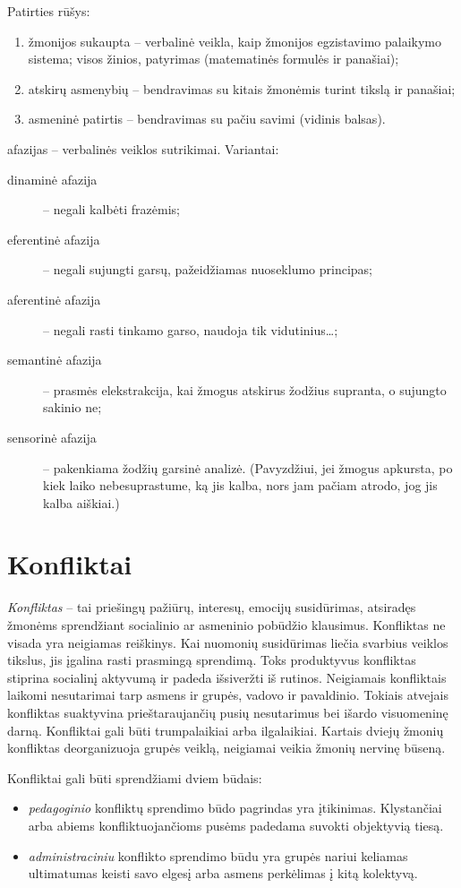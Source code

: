 Patirties rūšys:
\begin{enumerate}
  \item žmonijos sukaupta – verbalinė veikla, kaip žmonijos egzistavimo 
    palaikymo sistema; visos žinios, patyrimas (matematinės formulės
    ir panašiai);
  \item atskirų asmenybių – bendravimas su kitais žmonėmis turint tikslą
    ir panašiai;
  \item asmeninė patirtis – bendravimas su pačiu savimi (vidinis balsas).
\end{enumerate}

\Glspl{afazija} – verbalinės veiklos sutrikimai. Variantai:
\begin{description}
  \item[dinaminė afazija] – negali kalbėti frazėmis;
  \item[eferentinė afazija] – negali sujungti garsų, pažeidžiamas nuoseklumo
    principas;
  \item[aferentinė afazija] – negali rasti tinkamo garso, naudoja tik
    vidutinius…; %
  \item[semantinė afazija]  – prasmės elekstrakcija, 
    kai žmogus atskirus žodžius supranta, o sujungto sakinio ne;
  \item[sensorinė afazija] – pakenkiama žodžių garsinė analizė. (Pavyzdžiui,
    jei žmogus apkursta, po kiek laiko nebesuprastume, ką jis kalba, nors
    jam pačiam atrodo, jog jis kalba aiškiai.)
\end{description}

\section{Konfliktai}

\label{tema:konfliktai}

\emph{Konfliktas} – tai priešingų pažiūrų, interesų, emocijų susidūrimas, 
atsiradęs žmonėms sprendžiant socialinio ar asmeninio pobūdžio klausimus.
Konfliktas ne visada yra neigiamas reiškinys. Kai nuomonių susidūrimas 
liečia svarbius veiklos tikslus, jis įgalina rasti prasmingą sprendimą. 
Toks produktyvus konfliktas stiprina socialinį aktyvumą ir padeda 
išsiveržti iš rutinos. Neigiamais konfliktais laikomi nesutarimai tarp 
asmens ir grupės, vadovo ir pavaldinio. Tokiais atvejais konfliktas 
suaktyvina prieštaraujančių pusių nesutarimus bei išardo visuomeninę darną. 
Konfliktai gali būti trumpalaikiai arba ilgalaikiai. Kartais dviejų žmonių 
konfliktas deorganizuoja grupės veiklą, neigiamai veikia žmonių nervinę 
būseną.

Konfliktai gali būti sprendžiami dviem būdais:
\begin{itemize}
  \item \emph{pedagoginio} konfliktų sprendimo būdo pagrindas yra 
    įtikinimas. Klystančiai arba abiems konfliktuojančioms pusėms padedama 
    suvokti objektyvią tiesą. 
  \item \emph{administraciniu} konflikto sprendimo būdu yra grupės nariui 
    keliamas ultimatumas keisti savo elgesį arba asmens perkėlimas į kitą 
    kolektyvą.
\end{itemize}
